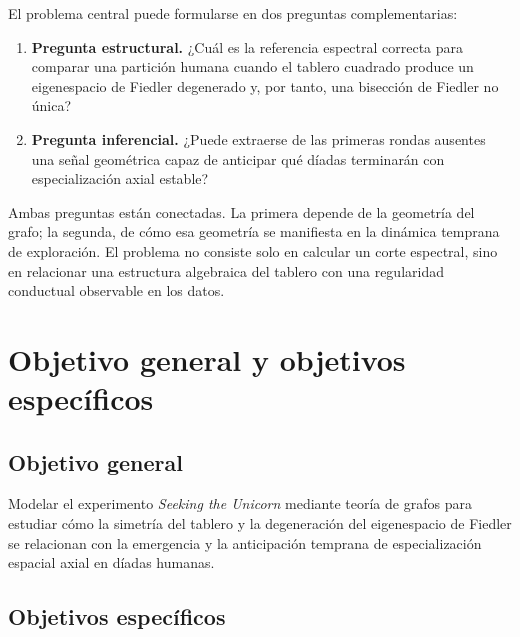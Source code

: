 \documentclass[journal]{IEEEtran}
\begin{document}
El problema central puede formularse en dos preguntas complementarias:
\begin{enumerate}
\item \textbf{Pregunta estructural.} ¿Cuál es la referencia espectral correcta para comparar una partición humana cuando el tablero cuadrado produce un eigenespacio de Fiedler degenerado y, por tanto, una bisección de Fiedler no única?
\item \textbf{Pregunta inferencial.} ¿Puede extraerse de las primeras rondas ausentes una señal geométrica capaz de anticipar qué díadas terminarán con especialización axial estable?
\end{enumerate}

Ambas preguntas están conectadas. La primera depende de la geometría del grafo; la segunda, de cómo esa geometría se manifiesta en la dinámica temprana de exploración. El problema no consiste solo en calcular un corte espectral, sino en relacionar una estructura algebraica del tablero con una regularidad conductual observable en los datos.

\section{Objetivo general y objetivos específicos}

\subsection{Objetivo general}

Modelar el experimento \emph{Seeking the Unicorn} mediante teoría de grafos para estudiar cómo la simetría del tablero y la degeneración del eigenespacio de Fiedler se relacionan con la emergencia y la anticipación temprana de especialización espacial axial en díadas humanas.

\subsection{Objetivos específicos}
\end{document}
